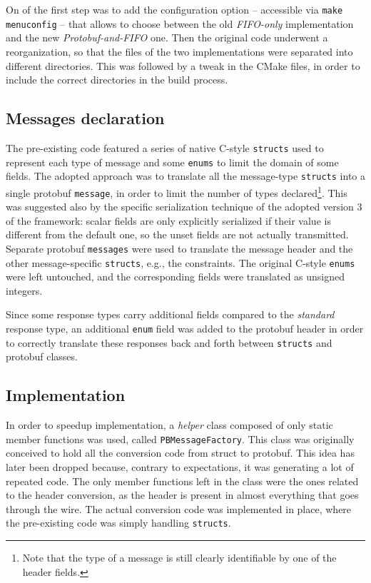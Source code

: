 On of the first step was to add the configuration option -- accessible via \texttt{make menuconfig} -- that allows to choose between the old \emph{FIFO-only} implementation and the new \emph{Protobuf-and-FIFO} one. Then the original code underwent a reorganization, so that the files of the two implementations were separated into different directories. This was followed by a tweak in the CMake files, in order to include the correct directories in the build process.

\subsection{Messages declaration}
\label{sec:messages-declaration}

The pre-existing code featured a series of native C-style \texttt{structs} used to represent each type of message and some \texttt{enums} to limit the domain of some fields. The adopted approach was to translate all the message-type \texttt{structs} into a single protobuf \texttt{message}, in order to limit the number of types declared\footnote{Note that the type of a message is still clearly identifiable by one of the header fields.}. This was suggested also by the specific serialization technique of the adopted version 3 of the framework: scalar fields are only explicitly serialized if their value is different from the default one, so the unset fields are not actually transmitted. Separate protobuf \texttt{messages} were used to translate the message header and the other message-specific \texttt{structs}, e.g.,  the constraints. The original C-style \texttt{enums} were left untouched, and the corresponding fields were translated as unsigned integers.

Since some response types carry additional fields compared to the \emph{standard} response type, an additional \texttt{enum} field was added to the protobuf header in order to correctly translate these responses back and forth between \texttt{structs} and protobuf classes.

\subsection{Implementation}

In order to speedup implementation, a \emph{helper} class composed of only static member functions was used, called \texttt{PBMessageFactory}. This class was originally conceived to hold all the conversion code from struct to protobuf. This idea has later been dropped because, contrary to expectations, it was generating a lot of repeated code. The only member functions left in the class were the ones related to the header conversion, as the header is present in almost everything that goes through the wire. The actual conversion code was implemented in place, where the pre-existing code was simply handling \texttt{structs}.

